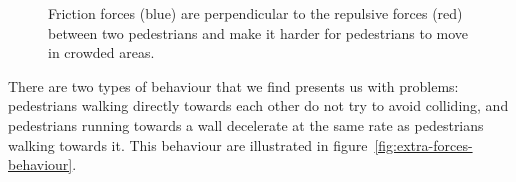\begin{figure}
    \centering
    \caption[Friction forces]{Friction forces (blue) are perpendicular to the 
    repulsive forces (red) between two pedestrians and make it harder for 
    pedestrians to move in crowded areas.}
    \label{fig:friction}
\end{figure}

There are two types of behaviour that we find presents us with problems: 
pedestrians walking directly towards each other do not try to avoid colliding, 
and pedestrians running towards a wall decelerate at the same rate as 
pedestrians walking towards it. This behaviour are illustrated in 
figure~\ref{fig:extra-forces-behaviour}.

